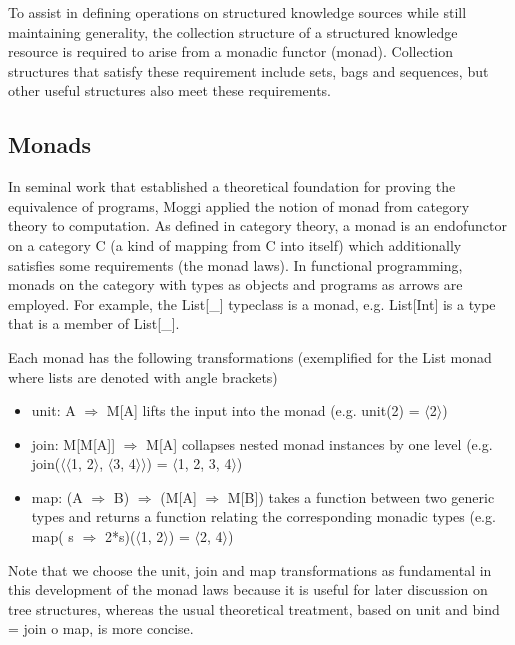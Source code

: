 \documentclass[runningheads]{llncs}
\begin{document}
To assist in defining operations on structured knowledge sources while still maintaining generality, the collection structure of a structured knowledge resource is required to arise from a monadic functor (monad). Collection structures that satisfy these requirement include sets, bags and sequences, but other useful structures also meet these requirements.

\vspace{-0.3cm}
\subsection{Monads}
In seminal work that established a theoretical foundation for proving the equivalence of programs, Moggi\cite{moggi_notions_1991} applied the notion of monad from category theory\cite{MacLane1998} to computation.
As defined in category theory, a monad  is an endofunctor on a category C (a kind of mapping from C into itself) which additionally satisfies some requirements (the monad laws).
In functional programming, monads on the category with types as objects and programs as arrows are employed.
For example, the List[\_] typeclass is a monad, e.g. List[Int] is a type that is a member of List[\_].

Each monad has the following transformations (exemplified for the List monad where lists are denoted with angle brackets)
\begin{itemize}
\item unit: A $\Rightarrow$ M[A] lifts the input into the monad (e.g. unit(2) = $\langle$2$\rangle$)
\item join: M[M[A]] $\Rightarrow$ M[A] collapses nested monad instances by one level (e.g. join($\langle$$\langle$1, 2$\rangle$, $\langle$3, 4$\rangle$$\rangle$) = $\langle$1, 2, 3, 4$\rangle$)
\item map: (A $\Rightarrow$ B) $\Rightarrow$ (M[A] $\Rightarrow$ M[B]) takes a function between two generic types and returns a function relating the corresponding monadic types (e.g. map( s $\Rightarrow$ 2*s)($\langle$1, 2$\rangle$) = $\langle$2, 4$\rangle$)
\end{itemize}
Note that we choose the unit, join and map transformations\cite{Wadler1992} as fundamental in this development of the monad laws because it is useful for later discussion on tree structures, whereas the usual theoretical treatment, based on unit and bind = join o map, is more concise.
\end{document}
